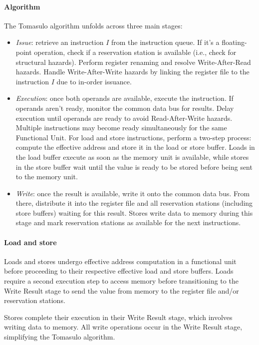 \paragraph*{Algorithm}
The Tomasulo algorithm unfolds across three main stages:
\begin{itemize}
    \item \textit{Issue}: retrieve an instruction $I$ from the instruction queue. 
        If it's a floating-point operation, check if a reservation station is available (i.e., check for structural hazards). 
        Perform register renaming and resolve Write-After-Read hazards. 
        Handle Write-After-Write hazards by linking the register file to the instruction $I$ due to in-order issuance.
    \item \textit{Execution}: once both operands are available, execute the instruction. 
        If operands aren't ready, monitor the common data bus for results. 
        Delay execution until operands are ready to avoid Read-After-Write hazards. 
        Multiple instructions may become ready simultaneously for the same Functional Unit. 
        For load and store instructions, perform a two-step process: compute the effective address and store it in the load or store buffer. 
        Loads in the load buffer execute as soon as the memory unit is available, while stores in the store buffer wait until the value is ready to be stored before being sent to the memory unit.
    \item \textit{Write}: once the result is available, write it onto the common data bus. 
        From there, distribute it into the register file and all reservation stations (including store buffers) waiting for this result. 
        Stores write data to memory during this stage and mark reservation stations as available for the next instructions.
\end{itemize}

\paragraph*{Load and store}
Loads and stores undergo effective address computation in a functional unit before proceeding to their respective effective load and store buffers. 
Loads require a second execution step to access memory before transitioning to the Write Result stage to send the value from memory to the register file and/or reservation stations.

Stores complete their execution in their Write Result stage, which involves writing data to memory. 
All write operations occur in the Write Result stage, simplifying the Tomasulo algorithm.

